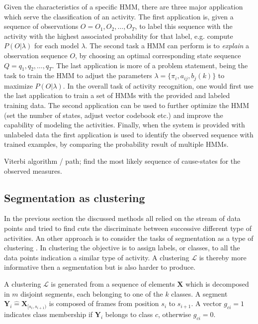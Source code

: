 Given the characteristics of a specific HMM, there are three major application 
which serve the classification of an activity. The first application is, given 
a sequence of observations $O = O_1,O_2,\dots,O_T$, to label this sequence 
with the activity with 
the highest associated probability for that label, e.g. compute $P(O|\lambda)$ 
for each model $\lambda$. The second task a HMM can perform is to 
\emph{explain} a observation sequence $O$, by choosing an optimal 
corresponding state sequence $Q = q_1,q_2,\dots,q_T$. The last application is 
more of a problem statement, being the task to train the HMM to adjust the 
parameters $\lambda = \{ \pi_i, a_{ij}, b_j(k)\}$ to maximize $P(O|\lambda)$. 
In the overall task of activity recognition, one would first use the last 
application to train a set of HMMs with the provided and labeled training 
data. The second application can be used to further optimize the HMM (set the 
number of states, adjust vector codebook etc.) and improve the capability of 
modeling the activities. Finally, when the system is provided with unlabeled 
data the first application is used to identify the observed sequence with 
trained examples, by comparing the probability result of multiple HMMs.



Viterbi algorithm / path; find the most likely sequence of cause-states for 
the observed measures.





\subsection{Segmentation as clustering}
In the previous section the discussed methods all relied on the stream of data 
points and tried to find cuts the discriminate between successive different 
type of activities. An other approach is to consider the tasks of segmentation 
as a type of clustering \cite{zhou2008aligned}. In clustering the objective is 
to assign labels, or classes, to all the data points indication a similar type 
of activity. A clustering $\mathcal{L}$ is thereby more informative then a 
segmentation but is also harder to produce.

A clustering $\mathcal{L}$ is generated from a sequence of elements 
$\mathbf{X}$ which is decomposed in $m$ disjoint segments, each belonging to 
one of the $k$ classes. A segment $\mathbf{Y}_i \hat{=} 
\mathbf{X}_{[s_i,s_{i+1})}$ is composed of frames from position $s_i$ to 
$s_{i+1}$. A vector $g_{ci} = 1$ indicates class membership if $\mathbf{Y}_i$ 
belongs to class $c$, otherwise $g_{ci} = 0$.

